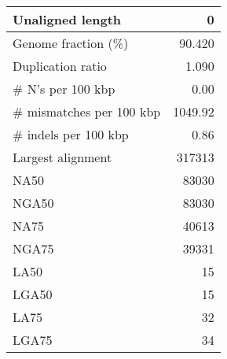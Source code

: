 \documentclass[12pt,a4paper]{article}
\begin{document}
\begin{table}[ht]
\begin{center}
\begin{tabular}{|l*{1}{|r}|}
Unaligned length & 0 \\ \hline
Genome fraction (\%) & 90.420 \\ \hline
Duplication ratio & 1.090 \\ \hline
\# N's per 100 kbp & 0.00 \\ \hline
\# mismatches per 100 kbp & 1049.92 \\ \hline
\# indels per 100 kbp & 0.86 \\ \hline
Largest alignment & 317313 \\ \hline
NA50 & 83030 \\ \hline
NGA50 & 83030 \\ \hline
NA75 & 40613 \\ \hline
NGA75 & 39331 \\ \hline
LA50 & 15 \\ \hline
LGA50 & 15 \\ \hline
LA75 & 32 \\ \hline
LGA75 & 34 \\ \hline
\end{tabular}
\end{center}
\end{table}
\end{document}
